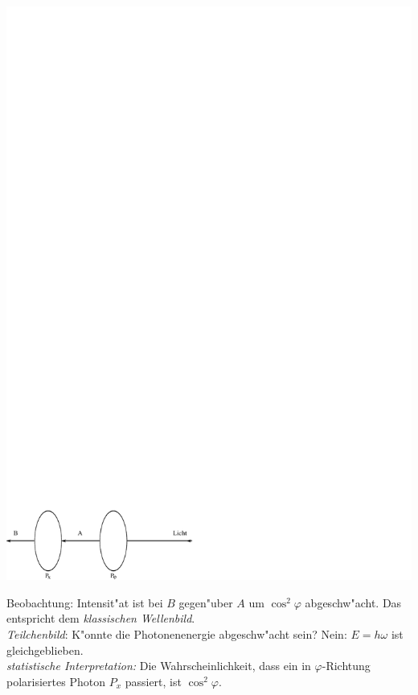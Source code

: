 \documentclass[a4paper]{scrartcl}
\begin{document}
{\begin{center}
\includegraphics{003Polarisationsfilter2}
\end{center}
Beobachtung: Intensit"at ist bei $B$ gegen"uber $A$ um $\cos^2 \varphi$ abgeschw"acht. Das entspricht dem \emph{klassischen Wellenbild}. \\
\emph{Teilchenbild}: K"onnte die Photonenenergie abgeschw"acht sein? Nein: $E = h \omega$ ist gleichgeblieben. \\
\emph{statistische Interpretation:} 
Die Wahrscheinlichkeit, dass ein in $\varphi$-Richtung polarisiertes Photon $P_x$ passiert, ist $\cos^2 \varphi$.

}
\end{document}
